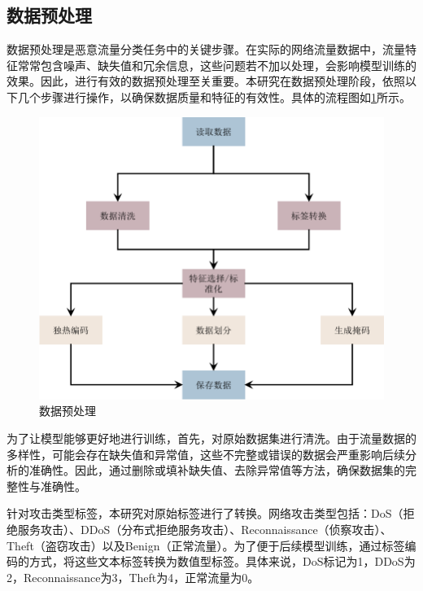 \documentclass[promaster]{thesis-uestc}
\begin{document}
\subsection{数据预处理}
数据预处理是恶意流量分类任务中的关键步骤。在实际的网络流量数据中，流量特征常常包含噪声、缺失值和冗余信息，这些问题若不加以处理，会影响模型训练的效果。因此，进行有效的数据预处理至关重要。本研究在数据预处理阶段，依照以下几个步骤进行操作，以确保数据质量和特征的有效性。具体的流程图如\ref{DataPreprocessing}所示。
\begin{figure}[h!]
    \centering
    \includegraphics[width=0.75\linewidth]{./pic/数据预处理.pdf}
    \caption{数据预处理}
    \label{DataPreprocessing}
\end{figure}
为了让模型能够更好地进行训练，首先，对原始数据集进行清洗。由于流量数据的多样性，可能会存在缺失值和异常值，这些不完整或错误的数据会严重影响后续分析的准确性。因此，通过删除或填补缺失值、去除异常值等方法，确保数据集的完整性与准确性。

针对攻击类型标签，本研究对原始标签进行了转换。网络攻击类型包括：DoS（拒绝服务攻击）、DDoS（分布式拒绝服务攻击）、Reconnaissance（侦察攻击）、Theft（盗窃攻击）以及Benign（正常流量）。为了便于后续模型训练，通过标签编码的方式，将这些文本标签转换为数值型标签。具体来说，DoS标记为1，DDoS为2，Reconnaissance为3，Theft为4，正常流量为0。
\end{document}

